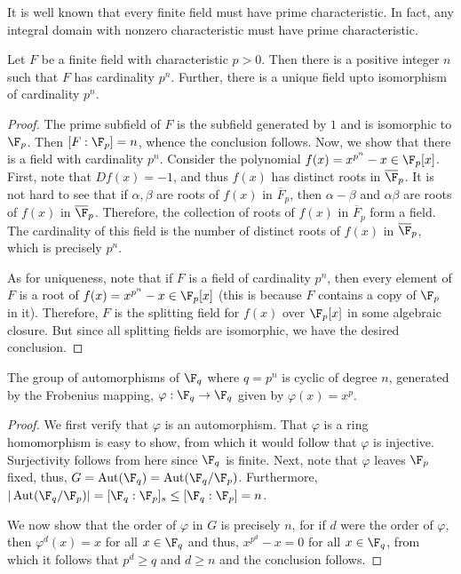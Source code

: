 It is well known that every finite field must have prime characteristic. In fact, any integral domain with nonzero characteristic must have prime characteristic.

\begin{theorem}
    Let $F$ be a finite field with characteristic $p > 0$. Then there is a positive integer $n$ such that $F$ has cardinality $p^n$. Further, there is a unique field upto isomorphism of cardinality $p^n$.
\end{theorem}
\begin{proof}
    The prime subfield of $F$ is the subfield generated by $1$ and is isomorphic to $\F_p$. Then $[F:\F_p] = n$, whence the conclusion follows. Now, we show that there is a field with cardinality $p^n$. Consider the polynomial $f(x) = x^{p^n} - x\in\F_p[x]$. First, note that $Df(x) = -1$, and thus $f(x)$ has distinct roots in $\overline\F_p$. It is not hard to see that if $\alpha,\beta$ are roots of $f(x)$ in $\overline F_p$, then $\alpha - \beta$ and $\alpha\beta$ are roots of $f(x)$ in $\overline\F_p$. Therefore, the collection of roots of $f(x)$ in $\overline F_p$ form a field. The cardinality of this field is the number of distinct roots of $f(x)$ in $\overline\F_p$, which is precisely $p^n$.

    As for uniqueness, note that if $F$ is a field of cardinality $p^n$, then every element of $F$ is a root of $f(x) = x^{p^n} - x\in\F_p[x]$ (this is because $F$ contains a copy of $\F_p$ in it). Therefore, $F$ is the splitting field for $f(x)$ over $\F_p[x]$ in some algebraic closure. But since all splitting fields are isomorphic, we have the desired conclusion.
\end{proof}

\begin{theorem}[Frobenius]
    The group of automorphisms of $\F_q$ where $q = p^n$ is cyclic of degree $n$, generated by the Frobenius mapping, $\varphi:\F_q\to\F_q$ given by $\varphi(x) = x^p$.
\end{theorem}
\begin{proof}
    We first verify that $\varphi$ is an automorphism. That $\varphi$ is a ring homomorphism is easy to show, from which it would follow that $\varphi$ is injective. Surjectivity follows from here since $\F_q$ is finite. Next, note that $\varphi$ leaves $\F_p$ fixed, thus, $G = \Aut(\F_q) = \Aut(\F_q/\F_p)$. Furthermore, $|\Aut(\F_q/\F_p)| = [\F_q:\F_p]_s\le[\F_q:\F_p] = n$.

    We now show that the order of $\varphi$ in $G$ is precisely $n$, for if $d$ were the order of $\varphi$, then $\varphi^d(x) = x$ for all $x\in\F_q$ and thus, $x^{p^d} - x = 0$ for all $x\in\F_q$, from which it follows that $p^d\ge q$ and $d\ge n$ and the conclusion follows.
\end{proof}

